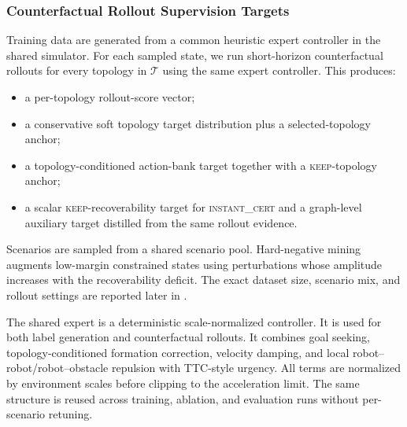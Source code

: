 \documentclass{ieeeaccess}
\newcommand{\cT}{\mathcal{T}}
\begin{document}
\subsubsection{Counterfactual Rollout Supervision Targets}
Training data are generated from a common heuristic expert controller in
the shared simulator. For each sampled state, we run short-horizon
counterfactual rollouts for every topology in $\cT$ using the same
expert controller. This produces:
\begin{itemize}
    \item a per-topology rollout-score vector;
    \item a conservative soft topology target distribution plus a selected-topology anchor;
    \item a topology-conditioned action-bank target together with a
    \textsc{keep}-topology anchor;
    \item a scalar \textsc{keep}-recoverability target for
    \textsc{instant\_cert} and a graph-level auxiliary target distilled from the same rollout evidence.
\end{itemize}
Scenarios are sampled from a shared scenario pool. Hard-negative mining
augments low-margin constrained states using perturbations whose
amplitude increases with the recoverability deficit. The exact dataset
size, scenario mix, and rollout settings are reported later in
.

The shared expert is a deterministic scale-normalized controller. It is
used for both label generation and counterfactual rollouts. It combines
goal seeking, topology-conditioned formation correction, velocity
damping, and local robot--robot/robot--obstacle repulsion with
TTC-style urgency. All terms are normalized by environment scales
before clipping to the acceleration limit. The same structure is reused
across training, ablation, and evaluation runs without per-scenario
retuning.
\end{document}
